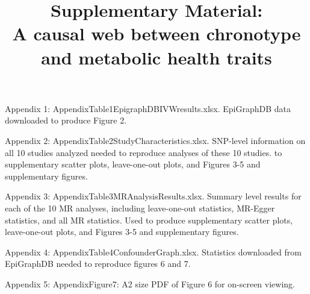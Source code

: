 \documentclass{article}
\title{{\bf Supplementary Material:} \\A causal web between chronotype and metabolic health traits}
\author{}
\date{}
\begin{document}
\maketitle

Appendix 1: AppendixTable1EpigraphDBIVWresults.xlsx. EpiGraphDB data downloaded to produce Figure 2.

Appendix 2: AppendixTable2StudyCharacteristics.xlsx.
SNP-level information on all 10 studies analyzed needed to reproduce analyses of these 10 studies. to supplementary scatter plots, leave-one-out plots, and Figures 3-5 and supplementary figures.

Appendix 3: AppendixTable3MRAnalysisResults.xlsx. Summary level results for each of the 10 MR analyses, including leave-one-out statistics, MR-Egger statistics, and all MR statistics. Used to produce supplementary scatter plots, leave-one-out plots, and Figures 3-5 and supplementary figures. 

Appendix 4: AppendixTable4ConfounderGraph.xlsx.
Statistics downloaded from EpiGraphDB needed to reproduce figures 6 and 7.

Appendix 5: AppendixFigure7: A2 size PDF of Figure 6 for on-screen viewing.
\end{document}
